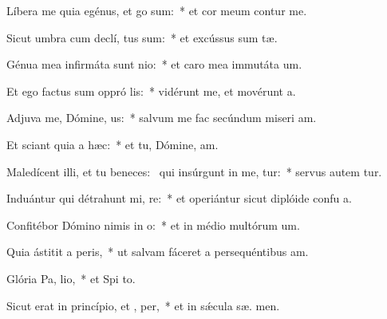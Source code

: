 \item Líbera me quia egénus, et  go sum:~* et cor meum contur   me.
\item Sicut umbra cum declí, tus sum:~* et excússus sum  tæ.
\item Génua mea infirmáta sunt  nio:~* et caro mea immutáta   um.
\item Et ego factus sum oppró lis:~* vidérunt me, et movérunt  a.
\item Adjuva me, Dómine,  us:~* salvum me fac secúndum miseri am.
\item Et sciant quia  a hæc:~* et tu, Dómine,  am.
\item Maledícent illi, et tu beneces:~\pscross{} qui insúrgunt in me, tur:~* servus autem  tur.
\item Induántur qui détrahunt mi, re:~* et operiántur sicut diplóide confu a.
\item Confitébor Dómino nimis in  o:~* et in médio multórum  um.
\item Quia ástitit a  peris,~* ut salvam fáceret a persequéntibus  am.
\item Glória Pa,  lio,~* et Spi to.
\item Sicut erat in princípio, et ,  per,~* et in sǽcula sæ. men.
